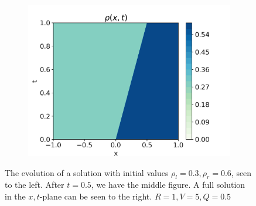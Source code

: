 \documentclass[10pt]{article}
\numberwithin{equation}{section}
\begin{document}
\begin{figure}
     \hfill
     \begin{subfigure}[b]{0.3\textwidth}
         \centering
         \includegraphics[width=\textwidth]{Figures/Model/Plots/ForwShockFull.png}
     \end{subfigure}
        \caption{The evolution of a solution with initial values $\rho_l = 0.3, \rho_r = 0.6$, seen to the left. After $t = 0.5$, we have the middle figure. A full solution in the $x,t$-plane can be seen to the right. $R = 1, V = 5, Q = 0.5$}
        \label{fig:ExampleForwardShock}
\end{figure}
\end{document}
